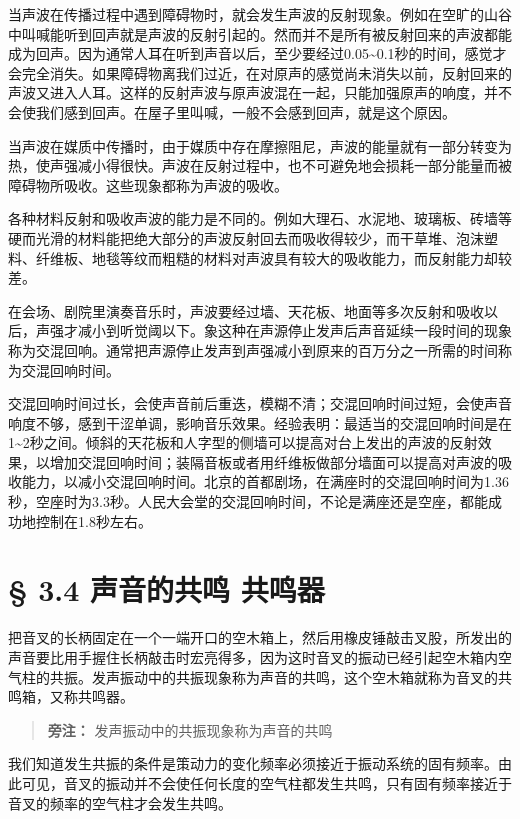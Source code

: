 当声波在传播过程中遇到障碍物时，就会发生声波的反射现象。例如在空旷的山谷中叫喊能听到回声就是声波的反射引起的。然而并不是所有被反射回来的声波都能成为回声。因为通常人耳在听到声音以后，至少要经过0.05\textasciitilde0.1秒的时间，感觉才会完全消失。如果障碍物离我们过近，在对原声的感觉尚未消失以前，反射回来的声波又进入人耳。这样的反射声波与原声波混在一起，只能加强原声的响度，并不会使我们感到回声。在屋子里叫喊，一般不会感到回声，就是这个原因。

当声波在媒质中传播时，由于媒质中存在摩擦阻尼，声波的能量就有一部分转变为热，使声强减小得很快。声波在反射过程中，也不可避免地会损耗一部分能量而被障碍物所吸收。这些现象都称为声波的吸收。

各种材料反射和吸收声波的能力是不同的。例如大理石、水泥地、玻璃板、砖墙等硬而光滑的材料能把绝大部分的声波反射回去而吸收得较少，而干草堆、泡沫塑料、纤维板、地毯等纹而粗糙的材料对声波具有较大的吸收能力，而反射能力却较差。

在会场、剧院里演奏音乐时，声波要经过墙、天花板、地面等多次反射和吸收以后，声强才减小到听觉阈以下。象这种在声源停止发声后声音延续一段时间的现象称为交混回响。通常把声源停止发声到声强减小到原来的百万分之一所需的时间称为交混回响时间。

交混回响时间过长，会使声音前后重迭，模糊不清；交混回响时间过短，会使声音响度不够，感到干涩单调，影响音乐效果。经验表明：最适当的交混回响时间是在1\textasciitilde2秒之间。倾斜的天花板和人字型的侧墙可以提高对台上发出的声波的反射效果，以增加交混回响时间；装隔音板或者用纤维板做部分墙面可以提高对声波的吸收能力，以减小交混回响时间。北京的首都剧场，在满座时的交混回响时间为1.36秒，空座时为3.3秒。人民大会堂的交混回响时间，不论是满座还是空座，都能成功地控制在1.8秒左右。

\section{§ 3.4 声音的共鸣
共鸣器}\label{ux58f0ux97f3ux7684ux5171ux9e23-ux5171ux9e23ux5668}

把音叉的长柄固定在一个一端开口的空木箱上，然后用橡皮锤敲击叉股，所发出的声音要比用手握住长柄敲击时宏亮得多，因为这时音叉的振动已经引起空木箱内空气柱的共振。发声振动中的共振现象称为声音的共鸣，这个空木箱就称为音叉的共鸣箱，又称共鸣器。

\begin{quote}
\textbf{旁注：} 发声振动中的共振现象称为声音的共鸣
\end{quote}

我们知道发生共振的条件是策动力的变化频率必须接近于振动系统的固有频率。由此可见，音叉的振动并不会使任何长度的空气柱都发生共鸣，只有固有频率接近于音叉的频率的空气柱才会发生共鸣。

